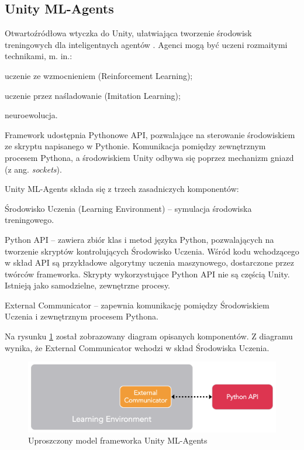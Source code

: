\subsection{Unity ML-Agents}
\label{UnityMlaDescription}
Otwartoźródłowa wtyczka do Unity, ułatwiająca tworzenie środowisk treningowych dla inteligentnych agentów \cite{unitymla:overview}. Agenci mogą być uczeni rozmaitymi technikami, m. in.:
\begin{itemize*}
\item uczenie ze wzmocnieniem (Reinforcement Learning);
\item uczenie przez naśladowanie (Imitation Learning);
\item neuroewolucja.
\end{itemize*}
Framework udostępnia Pythonowe API, pozwalające na sterowanie środowiskiem ze skryptu napisanego w Pythonie. Komunikacja pomiędzy zewnętrznym procesem Pythona, a środowiskiem Unity odbywa się poprzez mechanizm gniazd (z ang. \textit{sockets}).

Unity ML-Agents składa się z trzech zasadniczych komponentów:
\begin{enumerate*}
\item Środowisko Uczenia (Learning Environment) -- symulacja środowiska treningowego.
\item Python API -- zawiera zbiór klas i metod języka Python, pozwalających na tworzenie skryptów kontrolujących Środowisko Uczenia. Wśród kodu wchodzącego w skład API są przykładowe algorytmy uczenia maszynowego, dostarczone przez twórców frameworka. Skrypty wykorzystujące Python API nie są częścią Unity. Istnieją jako samodzielne, zewnętrzne procesy.
\item External Communicator -- zapewnia komunikację pomiędzy Środowiskiem Uczenia i zewnętrznym procesem Pythona.
\end{enumerate*}
Na rysunku \ref{UnityMlaBasicModel} został zobrazowany diagram opisanych komponentów.
Z diagramu wynika, że External Communicator wchodzi w skład Środowiska Uczenia.

\begin{figure}[h]
\begin{center}
\includegraphics[width=15cm]{resources/figures/unitymla_basic_architecture.png}
\caption{Uproszczony model frameworka Unity ML-Agents}
\label{UnityMlaBasicModel}
\end{center}
\end{figure}

